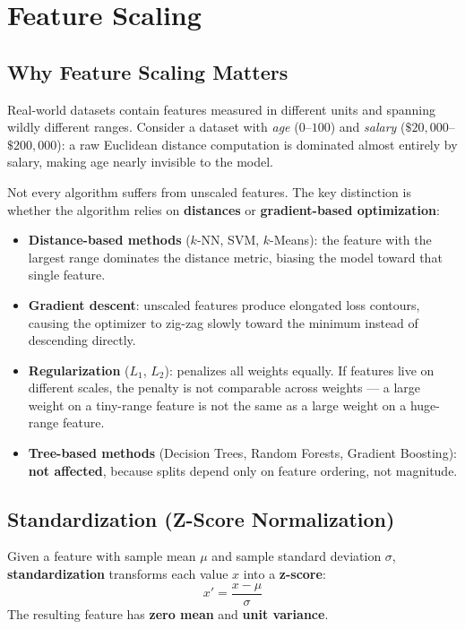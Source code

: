 \chapter*{Feature Scaling}

\section*{Why Feature Scaling Matters}

Real-world datasets contain features measured in different units and spanning wildly different ranges.
Consider a dataset with \textit{age} ($0$--$100$) and \textit{salary} ($\$20{,}000$--$\$200{,}000$):
a raw Euclidean distance computation is dominated almost entirely by salary, making age nearly invisible to the model.

\begin{remark}
Not every algorithm suffers from unscaled features.
The key distinction is whether the algorithm relies on \textbf{distances} or \textbf{gradient-based optimization}:
\begin{itemize}
    \item \textbf{Distance-based methods} ($k$-NN, SVM, $k$-Means): the feature with the largest range dominates the distance metric, biasing the model toward that single feature.
    \item \textbf{Gradient descent}: unscaled features produce elongated loss contours, causing the optimizer to zig-zag slowly toward the minimum instead of descending directly.
    \item \textbf{Regularization} ($L_1$, $L_2$): penalizes all weights equally. If features live on different scales, the penalty is not comparable across weights --- a large weight on a tiny-range feature is not the same as a large weight on a huge-range feature.
    \item \textbf{Tree-based methods} (Decision Trees, Random Forests, Gradient Boosting): \textbf{not affected}, because splits depend only on feature ordering, not magnitude.
\end{itemize}
\end{remark}

\section*{Standardization (Z-Score Normalization)}

\begin{definition}[Standardization]
Given a feature with sample mean $\mu$ and sample standard deviation $\sigma$, \textbf{standardization} transforms each value $x$ into a \textbf{z-score}:
$$x' = \frac{x - \mu}{\sigma}$$
The resulting feature has \textbf{zero mean} and \textbf{unit variance}.
\end{definition}

